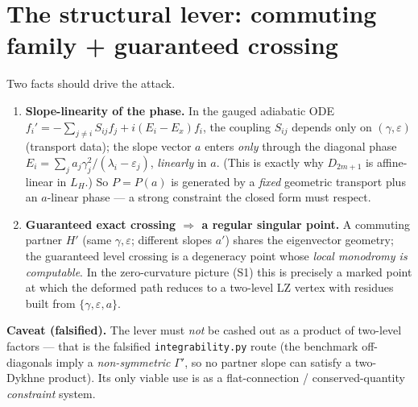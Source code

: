 \documentclass[11pt]{article}
\newcommand{\Gam}{\Gamma}
\newcommand{\eps}{\varepsilon}
\begin{document}
\section{The structural lever: commuting family + guaranteed crossing}
Two facts should drive the attack.
\begin{enumerate}[nosep,leftmargin=1.4em]
\item \textbf{Slope-linearity of the phase.} In the gauged adiabatic ODE
  $f_i'=-\sum_{j\ne i}S_{ij}f_j+i(E_i-E_x)f_i$, the coupling $S_{ij}$ depends only on
  $(\gamma,\eps)$ (transport data); the slope vector $a$ enters \emph{only} through the diagonal
  phase $E_i=\sum_j a_j\gamma_j^2/(\lambda_i-\eps_j)$, \emph{linearly} in $a$. (This is exactly
  why $D_{2m+1}$ is affine-linear in $L_H$.) So $P=P(a)$ is generated by a \emph{fixed} geometric
  transport plus an $a$-linear phase --- a strong constraint the closed form must respect.
\item \textbf{Guaranteed exact crossing $\Rightarrow$ a regular singular point.} A commuting
  partner $H'$ (same $\gamma,\eps$; different slopes $a'$) shares the eigenvector geometry; the
  guaranteed level crossing is a degeneracy point whose \emph{local monodromy is computable}. In
  the zero-curvature picture (S1) this is precisely a marked point at which the deformed path
  reduces to a two-level LZ vertex with residues built from $\{\gamma,\eps,a\}$.
\end{enumerate}
\textbf{Caveat (falsified).} The lever must \emph{not} be cashed out as a product of two-level
factors --- that is the falsified \texttt{integrability.py} route (the benchmark off-diagonals
imply a \emph{non-symmetric} $\Gam'$, so no partner slope can satisfy a two-Dykhne product). Its
only viable use is as a flat-connection / conserved-quantity \emph{constraint} system.

\end{document}
